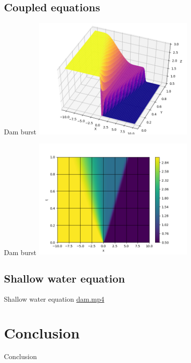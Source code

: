 \documentclass{beamer}
\begin{document}
        \subsection{Coupled equations}
            \begin{frame}{Dam burst}
                \pause
                \includegraphics[width=8cm]{damLF0.png}
            \end{frame}
            \begin{frame}{Dam burst}
                \includegraphics[width=8cm]{damLF0C.png}
            \end{frame}
        \subsection{Shallow water equation}
            \begin{frame}{Shallow water equation}
                \url{dam.mp4}
            \end{frame}
            
    \section{Conclusion}
        \begin{frame}{Conclusion}
            
        \end{frame}
        
\end{document}
